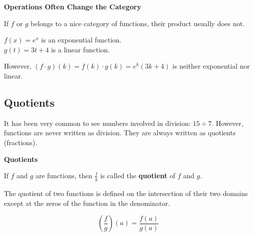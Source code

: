 \documentclass{ximera}
\begin{document}
\begin{warning} \textbf{\textcolor{red!70!black}{Operations Often Change the Category}}

If $f$ or $g$ belongs to a nice category of functions, their product usually does not.

\end{warning}





\begin{example}

$f(x) = e^x$ is an exponential function. \\
$g(t) = 3 t + 4$ is a linear function. 

However, $(f \cdot g)(k) = f(k) \cdot g(k) = e^k (3 k + 4)$ is neither exponential nor linear.

\end{example}























\subsection*{Quotients}



It has been very common to see numbers involved in division: $15 \div 7$. However, functions are never written as division. They are always written as quotients (fractions).




\begin{template}  \textbf{\textcolor{blue!55!black}{Quotients}} 


If  $f$ and $g$ are functions, then $\frac{f}{g}$ is called the \textbf{\textcolor{blue!55!black}{quotient}} of $f$ and $g$. 

The quotient of two functions is defined on the intersection of their two domains except at the zeros of the function in the denominator. 


\[ \left(\frac{f}{g}\right)(a) = \frac{f(a)}{g(a)}  \]



\end{template}
\end{document}

